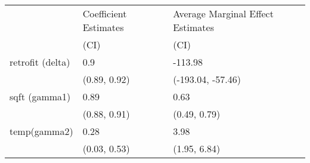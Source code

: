 \begin{tabular}{lll}
\toprule
{} & Coefficient Estimates & Average Marginal Effect Estimates \\
{} &                  (CI) &                              (CI) \\
\midrule
retrofit (delta) &                   0.9 &                           -113.98 \\
                 &          (0.89, 0.92) &                 (-193.04, -57.46) \\
sqft (gamma1)    &                  0.89 &                              0.63 \\
                 &          (0.88, 0.91) &                      (0.49, 0.79) \\
temp(gamma2)     &                  0.28 &                              3.98 \\
                 &          (0.03, 0.53) &                      (1.95, 6.84) \\
\bottomrule
\end{tabular}
